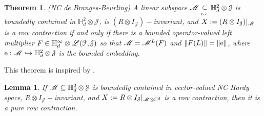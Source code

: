 \documentclass[11pt]{article}
\newcommand{\mr}{\ensuremath{\mathrm}}
\newcommand{\scr}{\ensuremath{\mathscr}}
\newcommand{\mc}{\ensuremath{\mathcal}}
\def\C{\mathbb{C}}
\def\bH{\mathbb{H}}
\newcommand{\J}{\ensuremath{\mathcal{J} }}
\renewcommand{\L}{\ensuremath{\mathscr{L} }}
\numberwithin{equation}{section}
\numberwithin{subsection}{section}
\newtheorem{thm}[subsection]{Theorem}
\newtheorem{lemma}[subsection]{Lemma}
\theoremstyle{definition}
\begin{document}
\begin{thm}{ (NC de Branges-Beurling)} \label{NCdBB}
A linear subspace $\scr{M} \underset{\mbox{\tiny \mbox{\tiny b.c.}}}{\subseteq} \bH ^2 _d \otimes \J$ is boundedly contained in $\bH ^2 _d \otimes \J$, is $(R \otimes I_\J ) -$invariant, and $X:= (R \otimes I_\J ) |_\scr{M}$ is a row contraction if and only if there is a bounded operator-valued left multiplier $F \in  \bH ^\infty _d \otimes \L (\mc{F} , \J ) $ so that $\scr{M} = \scr{M} ^L (F)$ and $\| F (L) \| = \| \mr{e} \|$, where $\mr{e} : \scr{M} \hookrightarrow \bH ^2 _d \otimes \J$ is the bounded embedding.  
\end{thm}
This theorem is inspired by \cite[Theorem 3]{dB-ss}.
\begin{lemma} \label{pure}
If $\scr{M} \subseteq \bH ^2 _d \otimes \J$ is boundedly contained in vector-valued NC Hardy space, $R \otimes I_\J -$invariant, and $X:=R \otimes I_\J | _{\scr{M} \otimes \C ^d}$ is a row contraction, then it is a pure row contraction.
\end{lemma}
\end{document}
